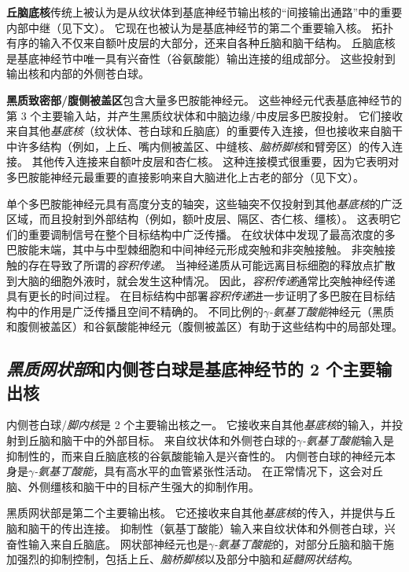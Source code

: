 \textbf{丘脑底核}传统上被认为是从纹状体到基底神经节输出核的“间接输出通路”中的重要内部中继（见下文）。
它现在也被认为是基底神经节的第二个重要输入核。
拓扑有序的输入不仅来自额叶皮层的大部分，还来自各种丘脑和脑干结构。
丘脑底核是基底神经节中唯一具有兴奋性（谷氨酸能）输出连接的组成部分。
这些投射到输出核和内部的外侧苍白球。


\textbf{黑质致密部/腹侧被盖区}包含大量多巴胺能神经元。
这些神经元代表基底神经节的第 3 个主要输入站，并产生黑质纹状体和中脑边缘/中皮层多巴胺投射。
它们接收来自其他\textit{基底核}（纹状体、苍白球和丘脑底）的重要传入连接，但也接收来自脑干中许多结构（例如，上丘、嘴内侧被盖区、中缝核、\textit{脑桥脚核}和臂旁区）的传入连接。
其他传入连接来自额叶皮层和杏仁核。
这种连接模式很重要，因为它表明对多巴胺能神经元最重要的直接影响来自大脑进化上古老的部分（见下文）。


单个多巴胺能神经元具有高度分支的轴突，这些轴突不仅投射到其他\textit{基底核}的广泛区域，而且投射到外部结构（例如，额叶皮层、隔区、杏仁核、缰核）。
这表明它们的重要调制信号在整个目标结构中广泛传播。
在纹状体中发现了最高浓度的多巴胺能末端，其中与中型棘细胞和中间神经元形成突触和非突触接触。
非突触接触的存在导致了所谓的\textit{容积传递}。
当神经递质从可能远离目标细胞的释放点扩散到大脑的细胞外液时，就会发生这种情况。
因此，\textit{容积传递}通常比突触神经传递具有更长的时间过程。
在目标结构中部署\textit{容积传递}进一步证明了多巴胺在目标结构中的作用是广泛传播且空间不精确的。
不同比例的\textit{$\gamma$-氨基丁酸能}神经元（黑质和腹侧被盖区）和谷氨酸能神经元（腹侧被盖区）有助于这些结构中的局部处理。



\subsection{\textit{黑质网状部}和内侧苍白球是基底神经节的 2 个主要输出核}

内侧苍白球/\textit{脚内核}是 2 个主要输出核之一。
它接收来自其他\textit{基底核}的输入，并投射到丘脑和脑干中的外部目标。
来自纹状体和外侧苍白球的\textit{$\gamma$-氨基丁酸能}输入是抑制性的，而来自丘脑底核的谷氨酸能输入是兴奋性的。
内侧苍白球的神经元本身是\textit{$\gamma$-氨基丁酸能}，具有高水平的血管紧张性活动。
在正常情况下，这会对丘脑、外侧缰核和脑干中的目标产生强大的抑制作用。


黑质网状部是第二个主要输出核。
它还接收来自其他\textit{基底核}的传入，并提供与丘脑和脑干的传出连接。
抑制性（氨基丁酸能）输入来自纹状体和外侧苍白球，兴奋性输入来自丘脑底。
网状部神经元也是\textit{$\gamma$-氨基丁酸能}的，对部分丘脑和脑干施加强烈的抑制控制，包括上丘、\textit{脑桥脚核}以及部分中脑和\textit{延髓网状结构}。



